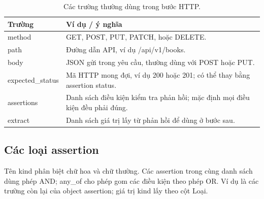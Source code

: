 \documentclass[../BTL.tex]{subfiles}
\begin{document}
\begin{table}[H]
\centering
\begin{tabularx}{\textwidth}{|p{3.1cm}|X|}
\hline
Trường & Ví dụ / ý nghĩa \\ \hline
\textnormal{method} & \textnormal{GET}, \textnormal{POST}, \textnormal{PUT}, \textnormal{PATCH}, hoặc \textnormal{DELETE}. \\ \hline
\textnormal{path} & Đường dẫn API, ví dụ \textnormal{/api/v1/books}. \\ \hline
\textnormal{body} & JSON gửi trong yêu cầu, thường dùng với \textnormal{POST} hoặc \textnormal{PUT}. \\ \hline
\textnormal{expected\_status} & Mã HTTP mong đợi, ví dụ \textnormal{200} hoặc \textnormal{201}; có thể thay bằng assertion \textnormal{status}. \\ \hline
\textnormal{assertions} & Danh sách điều kiện kiểm tra phản hồi; mặc định mọi điều kiện đều phải đúng. \\ \hline
\textnormal{extract} & Danh sách giá trị lấy từ phản hồi để dùng ở bước sau. \\ \hline
\end{tabularx}
\caption{Các trường thường dùng trong bước HTTP.}
\label{tab:http-step-quick-reference}
\end{table}

\subsection{Các loại assertion}

Tên \textnormal{kind} phân biệt chữ hoa và chữ thường. Các assertion trong cùng danh sách dùng phép AND; \textnormal{any\_of} cho phép gom các điều kiện theo phép OR. Ví dụ là các trường còn lại của object assertion; giá trị \textnormal{kind} lấy theo cột Loại.
\end{document}
